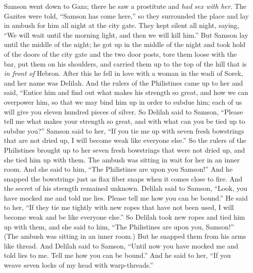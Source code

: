 \begin{biblechapter} %
 Samson went down to Gaza; there he saw a prostitute and \textit{had sex with her}.
\verse The Gazites were told, “Samson has come here,” so they surrounded the place and lay in ambush for him all night at the city gate. They kept silent all night, saying, “We will wait until the morning light, and then we will kill him.”
\verse But Samson lay until the middle of the night; he got up in the middle of the night and took hold of the doors of the city gate and the two door posts, tore them loose with the bar, put them on his shoulders, and carried them up to the top of the hill that is \textit{in front of} Hebron.
\verse After this he fell in love with a woman in the wadi of Sorek, and her name was Delilah.
\verse And the rulers of the Philistines came up to her and said, “Entice him and find out what makes his strength so great, and how we can overpower him, so that we may bind him up in order to subdue him; each of us will give you eleven hundred pieces of silver.
\verse So Delilah said to Samson, “Please tell me what makes your strength so great, and with what can you be tied up to subdue you?”
\verse Samson said to her, “If you tie me up with seven fresh bowstrings that are not dried up, I will become weak like everyone else.”
\verse So the rulers of the Philistines brought up to her seven fresh bowstrings that were not dried up, and she tied him up with them.
\verse The ambush was sitting in wait for her in an inner room. And she said to him, “The Philistines are upon you Samson!” And he snapped the bowstrings just as flax fiber snaps when it comes close to fire. And the secret of his strength remained unknown.
\verse Delilah said to Samson, “Look, you have mocked me and told me lies. Please tell me how you can be bound.”
\verse He said to her, “If they tie me tightly with new ropes that have not been used, I will become weak and be like everyone else.”
\verse So Delilah took new ropes and tied him up with them, and she said to him, “The Philistines are upon you, Samson!” (The ambush was sitting in an inner room.) But he snapped them from his arms like thread.
\verse And Delilah said to Samson, “Until now you have mocked me and told lies to me. Tell me how you can be bound.” And he said to her, “If you weave seven locks of my head with warp-threads.”

\end{biblechapter}
